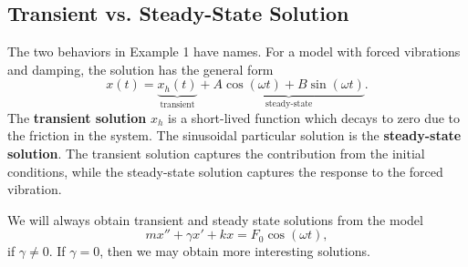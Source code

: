 \documentclass[10pt,letterpaper]{article}
\begin{document}
\subsection{Transient vs. Steady-State Solution}

The two behaviors in Example 1 have names. For a model with forced vibrations and damping, the solution has the general form
\[
x(t)=
\underbrace{x_h(t)}_{\text{transient}}
+
\underbrace{A\cos(\omega t)+B\sin(\omega t)}_{\text{steady-state}}.
\]
The \textbf{transient solution} $x_h$ is a short-lived function which decays to zero
due to the friction in the system. The sinusoidal particular solution
is the \textbf{steady-state solution}. The transient solution captures the contribution from the initial conditions, while the steady-state solution captures the response to the forced vibration.

We will always obtain transient and steady state solutions from the model
\[
mx''+\gamma x'+kx
=F_0\cos(\omega t),
\]
if $\gamma\ne0$. If $\gamma =0$, then we may obtain more interesting solutions.


\end{document}
